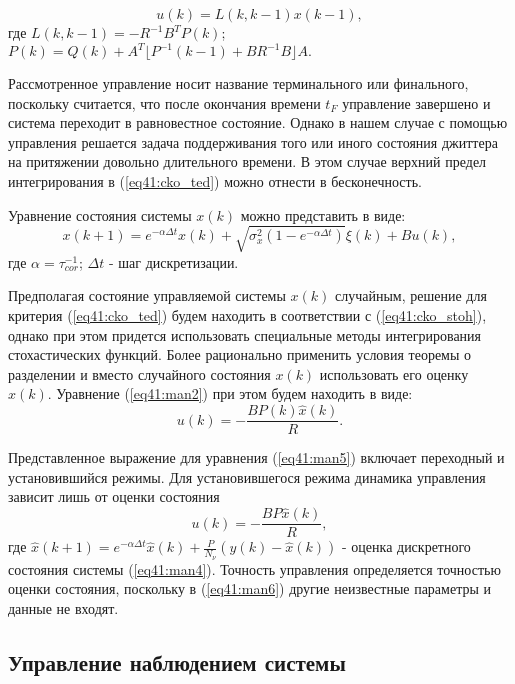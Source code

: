 \begin{equation}\label{eq41:man3}
u(k)=L(k,k-1)x(k-1),
\end{equation}
\noindent где $L(k,k-1)=-R^{-1}B^TP(k)$; $P(k)=Q(k)+A^T\lfloor P^{-1}(k-1)+BR^{-1}B\rfloor A.$

Рассмотренное управление носит название терминального или финального, поскольку считается, что после окончания времени $t_F$ управление завершено и система переходит в равновестное состояние.
Однако в нашем случае с помощью управления решается задача поддерживания того или иного состояния джиттера на притяжении довольно длительного времени. 
В этом случае верхний предел интегрирования в (\ref{eq41:cko_ted}) можно отнести в бесконечность.

Уравнение состояния системы $x(k)$ можно представить в виде:
\begin{equation}\label{eq41:man4}
x(k+1)=e^{-\alpha \Delta t}x(k)+\sqrt{\sigma^2_x(1-e^{-\alpha \Delta t})}\xi(k)+Bu(k),
\end{equation}
\noindent где $\alpha=\tau^{-1}_{cor}$; $\Delta t$ - шаг дискретизации.

Предполагая состояние управляемой системы $x(k)$ случайным, решение для критерия (\ref{eq41:cko_ted}) будем находить в соответствии с (\ref{eq41:cko_stoh}), однако при этом придется использовать специальные методы интегрирования стохастических функций.
Более рационально применить условия теоремы о разделении и вместо случайного состояния $x(k)$ использовать его оценку $\hat{x}(k)$. Уравнение (\ref{eq41:man2}) при этом будем находить в виде:
\begin{equation}\label{eq41:man5}
u(k)=-\frac{BP(k)\hat{x}(k)}{R}.
\end{equation}

Представленное выражение для уравнения (\ref{eq41:man5})  включает переходный и установившийся режимы. Для установившегося режима динамика управления зависит лишь от оценки состояния
\begin{equation}\label{eq41:man6}
u(k)=-\frac{BP\hat{x}(k)}{R},
\end{equation}
\noindent где $\hat x (k+1)=e^{-\alpha \Delta t}\hat x(k)+\frac{P}{N_\nu}(y(k)-\hat x(k))$ - оценка дискретного состояния системы (\ref{eq41:man4}).
Точность управления определяется точностью оценки состояния, поскольку в (\ref{eq41:man6}) другие неизвестные параметры и данные не входят.

\subsection{Управление наблюдением системы}

